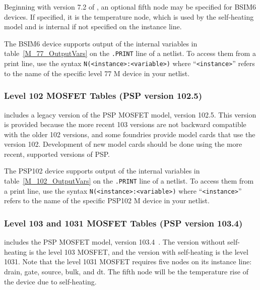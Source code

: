 Beginning with version 7.2 of \Xyce{}, an optional fifth node may be
specified for BSIM6 devices.  If specified, it is the temperature
node, which is used by the self-heating model and is internal if not
specified on the instance line.

The BSIM6 device supports output of the internal variables in
table~\ref{M_77_OutputVars} on the \texttt{.PRINT} line of a netlist.
To access them from a print line, use the syntax
\texttt{N(<instance>:<variable>)} where ``\texttt{<instance>}'' refers to the
name of the specific level 77 M device in your netlist.





\clearpage
\subsubsection{Level 102 MOSFET Tables (PSP version 102.5)}

\Xyce{} includes a legacy version of the PSP MOSFET model, version
102.5.  This version is provided because the more recent 103 versions
are not backward compatible with the older 102 versions, and some
foundries provide model cards that use the version 102.  Development
of new model cards should be done using the more recent, supported
versions of PSP.

The PSP102 device supports output of the internal variables in
table~\ref{M_102_OutputVars} on the \texttt{.PRINT} line of a netlist.
To access them from a print line, use the syntax
\texttt{N(<instance>:<variable>)} where ``\texttt{<instance>}'' refers to the
name of the specific PSP102 M device in your netlist.





\subsubsection{Level 103 and 1031 MOSFET Tables (PSP version 103.4)}

\Xyce{} includes the PSP MOSFET model, version 103.4~\cite{PSP:2006}.
The version without self-heating is the level 103 MOSFET, and the
version with self-heating is the level 1031.  Note that the level 1031
MOSFET requires five nodes on its instance line: drain, gate, source,
bulk, and dt.  The fifth node will be the temperature rise of the
device due to self-heating.

